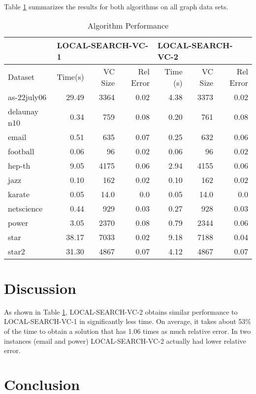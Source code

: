 \documentclass[sigconf]{acmart}
\begin{document}
Table \ref{table:algperf} summarizes the results for both algorithms on all graph data sets.

\begin{table}[h]
	\caption{Algorithm Performance}
	\label{table:algperf}
	\begin{tabular}{lrrrrrr}
		\toprule
		& \multicolumn{3}{l}{LOCAL-SEARCH-VC-1} & \multicolumn{3}{l}{LOCAL-SEARCH-VC-2} \\ \midrule
		Dataset & Time(s)    & VC Size   & Rel Error  & Time (s)   & VC Size   & Rel Error  \\ \midrule
		as-22july06    & 29.49   & 3364      & 0.02   & 4.38   & 3373      & 0.02   \\
		delaunay n10    & 0.34   & 759      & 0.08   & 0.20   & 761      & 0.08   \\
		email    & 0.51   & 635      & 0.07   & 0.25   & 632      & 0.06   \\
		football    & 0.06   & 96      & 0.02   & 0.06   & 96      & 0.02   \\
		hep-th    & 9.05   & 4175      & 0.06   & 2.94   & 4155      & 0.06   \\
		jazz    & 0.10   & 162      & 0.02   & 0.10   & 162      & 0.02   \\
		karate    & 0.05   & 14.0      & 0.0   & 0.05   & 14.0      & 0.0   \\
		netscience    & 0.44   & 929      & 0.03   & 0.27   & 928      & 0.03   \\
		power    & 3.05   & 2370      & 0.08   & 0.79   & 2344      & 0.06   \\
		star    & 38.17   & 7033      & 0.02   & 9.18   & 7188      & 0.04   \\
		star2    & 31.30   & 4867      & 0.07   & 4.12   & 4867      & 0.07   \\
		\bottomrule
	\end{tabular}
\end{table}

\section{Discussion}
As shown in Table \ref{table:algperf}, LOCAL-SEARCH-VC-2 obtains similar performance to LOCAL-SEARCH-VC-1 in significantly less time. On average, it takes about 53\% of the time to obtain a solution that has 1.06 times as much relative error. In two instances (email and power) LOCAL-SEARCH-VC-2 actually had lower relative error.

\section{Conclusion}


 
\end{document}
